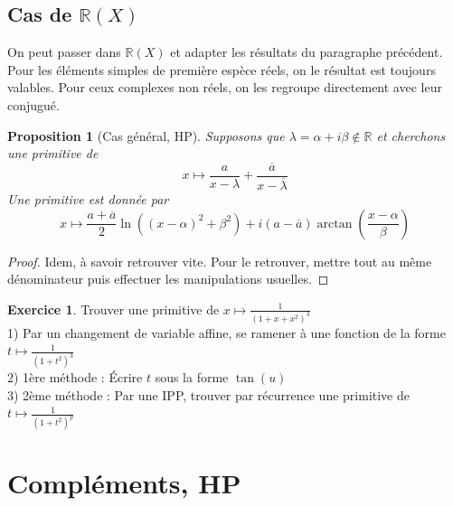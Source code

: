 \documentclass[french]{book}
\newcommand{\R}{\mathbb{R}}
\theoremstyle{plain}
\newtheorem{prop}{Proposition}[chapter]
\theoremstyle{definition}
\newtheorem{exe}{Exercice}[chapter]
\theoremstyle{remark}
\begin{document}
\subsection{Cas de $\R(X)$}
On peut passer dans $\R(X)$ et adapter les résultats du paragraphe précédent. Pour les éléments simples de première espèce réels, on le résultat est toujours valables. Pour ceux complexes non réels, on les regroupe directement avec leur conjugué.
\begin{prop}[Cas général, HP]
	Supposons que $\lambda=\alpha+i\beta\notin\R$ et cherchons une primitive de $$x\mapsto\frac{a}{x-\lambda}+\frac{\overline{a}}{x-\overline{\lambda}}$$ Une primitive est donnée par $$x\mapsto \frac{a+\overline{a}}{2}\ln\left((x-\alpha)^2+\beta^2\right)+i(a-\overline{a})\arctan\left(\frac{x-\alpha}{\beta}\right)$$
\end{prop}
\begin{proof}
	Idem, à savoir retrouver vite. Pour le retrouver, mettre tout au même dénominateur puis effectuer les manipulations usuelles.
\end{proof}
\begin{exe}
	Trouver une primitive de $\displaystyle x\mapsto\frac{1}{(1+x+x^2)^3}$
\\ 1) Par un changement de variable affine, se ramener à une fonction de la forme $\displaystyle t\mapsto\frac{1}{(1+t^2)^3}$
\\ 2) 1ère méthode : Écrire $t$ sous la forme $\tan(u)$
\\ 3) 2ème méthode : Par une IPP, trouver par récurrence une primitive de $\displaystyle t\mapsto\frac{1}{(1+t^2)^p}$
\end{exe}
\section{Compléments, HP}
\end{document}
